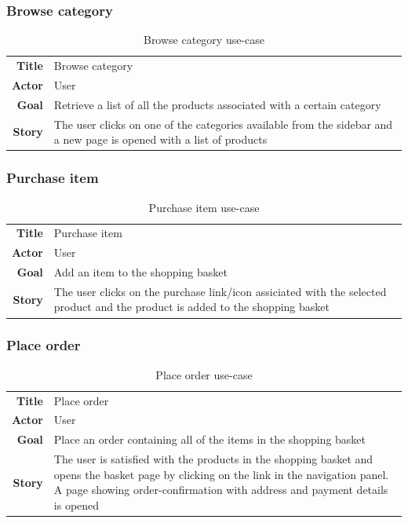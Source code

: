 \documentclass[12pt, a4paper,titlepage]{article}
\begin{document}
\subsubsection{Browse category}

\begin{table}[H]
\centering
\begin{tabular}{r | p{12cm}}
\textbf{Title} & Browse category \\
\textbf{Actor} & User \\
\textbf{Goal} & Retrieve a list of all the products associated with a certain category \\
\textbf{Story} & The user clicks on one of the categories available from the sidebar and a new page is opened with a list of products \\
\end{tabular}
\caption{Browse category use-case}
\end{table}

\subsubsection{Purchase item}
\begin{table}[H]
\centering
\begin{tabular}{r | p{12cm}}
\textbf{Title} & Purchase item \\
\textbf{Actor} & User \\
\textbf{Goal} & Add an item to the shopping basket \\
\textbf{Story} & The user clicks on the purchase link/icon assiciated with the selected product and the product is added to the shopping basket\\
\end{tabular}
\caption{Purchase item use-case}
\end{table}

\subsubsection{Place order}
\begin{table}[H]
\centering
\begin{tabular}{r | p{12cm}}
\textbf{Title} & Place order \\
\textbf{Actor} & User \\
\textbf{Goal} & Place an order containing all of the items in the shopping basket \\
\textbf{Story} & The user is satisfied with the products in the shopping basket and opens the basket page by clicking on the link in the navigation panel.
A page showing order-confirmation with address and payment details is opened \\
\end{tabular}
\caption{Place order use-case}
\end{table}
\end{document}
